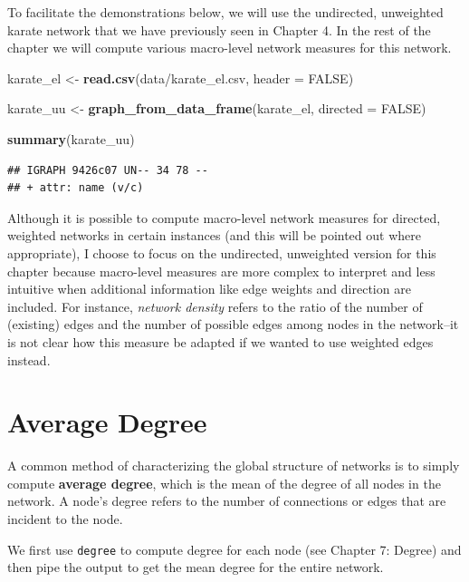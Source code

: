 \documentclass[
]{book}
\newenvironment{Shaded}{\begin{snugshade}}{\end{snugshade}}
\newcommand{\AttributeTok}[1]{\textcolor[rgb]{0.13,0.29,0.53}{#1}}
\newcommand{\ConstantTok}[1]{\textcolor[rgb]{0.56,0.35,0.01}{#1}}
\newcommand{\FunctionTok}[1]{\textcolor[rgb]{0.13,0.29,0.53}{\textbf{#1}}}
\newcommand{\NormalTok}[1]{#1}
\newcommand{\OtherTok}[1]{\textcolor[rgb]{0.56,0.35,0.01}{#1}}
\newcommand{\StringTok}[1]{\textcolor[rgb]{0.31,0.60,0.02}{#1}}
\begin{document}
To facilitate the demonstrations below, we will use the undirected, unweighted karate network that we have previously seen in Chapter 4. In the rest of the chapter we will compute various macro-level network measures for this network.

\begin{Shaded}
\begin{Highlighting}[]
\NormalTok{karate\_el }\OtherTok{\textless{}{-}} \FunctionTok{read.csv}\NormalTok{(}\StringTok{\textquotesingle{}data/karate\_el.csv\textquotesingle{}}\NormalTok{, }\AttributeTok{header =} \ConstantTok{FALSE}\NormalTok{)}

\NormalTok{karate\_uu }\OtherTok{\textless{}{-}} \FunctionTok{graph\_from\_data\_frame}\NormalTok{(karate\_el, }\AttributeTok{directed =} \ConstantTok{FALSE}\NormalTok{)}

\FunctionTok{summary}\NormalTok{(karate\_uu)}
\end{Highlighting}
\end{Shaded}

\begin{verbatim}
## IGRAPH 9426c07 UN-- 34 78 -- 
## + attr: name (v/c)
\end{verbatim}

Although it is possible to compute macro-level network measures for directed, weighted networks in certain instances (and this will be pointed out where appropriate), I choose to focus on the undirected, unweighted version for this chapter because macro-level measures are more complex to interpret and less intuitive when additional information like edge weights and direction are included. For instance, \emph{network density} refers to the ratio of the number of (existing) edges and the number of possible edges among nodes in the network--it is not clear how this measure be adapted if we wanted to use weighted edges instead.

\section{Average Degree}\label{average-degree}

A common method of characterizing the global structure of networks is to simply compute \textbf{average degree}, which is the mean of the degree of all nodes in the network. A node's degree refers to the number of connections or edges that are incident to the node.

We first use \texttt{degree} to compute degree for each node (see Chapter 7: Degree) and then pipe the output to get the mean degree for the entire network.
\end{document}
